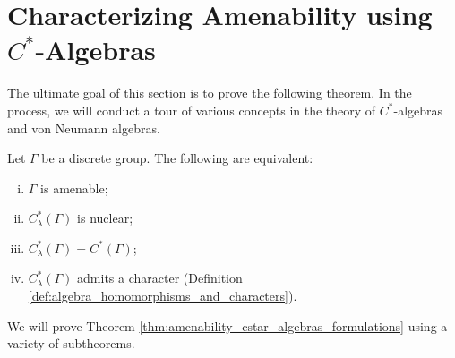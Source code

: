 \section{Characterizing Amenability using \texorpdfstring{$C^{\ast}$-Algebras}{C*-Algebras}}%
The ultimate goal of this section is to prove the following theorem. In the process, we will conduct a tour of various concepts in the theory of $C^{\ast}$-algebras and von Neumann algebras.
\begin{theorem}\label{thm:amenability_cstar_algebras_formulations}
  Let $\Gamma$ be a discrete group. The following are equivalent:
  \begin{enumerate}[(i)]
    \item $\Gamma$ is amenable;
    \item $C^{\ast}_{\lambda}\left( \Gamma \right)$ is nuclear;
    \item $C^{\ast}_{\lambda}\left( \Gamma \right) = C^{\ast}\left( \Gamma \right)$;
    \item $C^{\ast}_{\lambda}\left( \Gamma \right)$ admits a character (Definition \ref{def:algebra_homomorphisms_and_characters}).
  \end{enumerate}
\end{theorem}
We will prove Theorem \ref{thm:amenability_cstar_algebras_formulations} using a variety of subtheorems.
